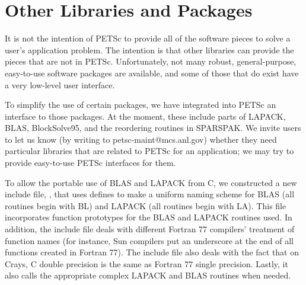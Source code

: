 \section{Other Libraries and Packages}

It is not the intention of PETSc to provide all of the software pieces 
to solve a user's application problem. The intention is that other 
libraries can provide the pieces that are not in PETSc.  Unfortunately, 
not many robust, general-purpose, easy-to-use software packages 
are available, and some of those that do exist have a very low-level 
user interface. 

  
To simplify the use of certain packages, we have integrated
into PETSc an interface to those packages. At the moment, these include
parts of LAPACK, BLAS, BlockSolve95, and the reordering routines in 
SPARSPAK.  We invite users to let us know (by writing to petsc-maint@mcs.anl.gov)
whether they need particular libraries that 
are related to PETSc for an application; we may try to provide 
easy-to-use PETSc interfaces for them.

To allow the portable use of BLAS and LAPACK from C, we constructed a
new include file, 
, that uses defines to make
a uniform naming scheme for BLAS (all routines begin with BL) and
LAPACK (all routines begin with LA). This file incorporates function
prototypes for the BLAS and LAPACK routines used. In addition, the
include file deals with different Fortran 77 compilers' treatment of
function names (for instance, Sun compilers put an underscore at the
end of all functions created in Fortran 77).  The include file also
deals with the fact that on Crays, C double precision is the same as
Fortran 77 single precision.  Lastly, it also calls the appropriate
complex LAPACK and BLAS routines when needed.

